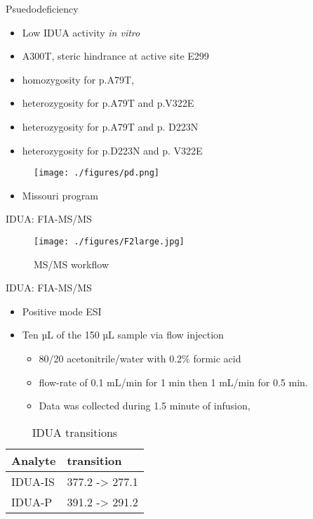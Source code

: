 \documentclass[presentation, smaller]{beamer}
\begin{document}
\begin{frame}[label={sec:orgheadline12}]{Psuedodeficiency}
\begin{itemize}
\item Low IDUA activity \emph{in vitro}
\item A300T, steric hindrance at active site E299
\item homozygosity for p.A79T,
\item heterozygosity for p.A79T and p.V322E
\item heterozygosity for p.A79T and p. D223N
\item heterozygosity for p.D223N and p. V322E
\end{itemize}

\begin{figure}[htb]
\centering
\texttt{[image: ./figures/pd.png]}
\label{fig:pd}
\end{figure}


\begin{itemize}
\item Missouri program
\end{itemize}
\end{frame}


\begin{frame}[label={sec:orgheadline13}]{IDUA: FIA-MS/MS}
\begin{figure}[htb]
\centering
\texttt{[image: ./figures/F2large.jpg]}
\caption{\label{fig:msmswf}
MS/MS workflow}
\end{figure}
\end{frame}


\begin{frame}[label={sec:orgheadline14}]{IDUA: FIA-MS/MS}
\begin{itemize}
\item Positive mode ESI
\item Ten µL of the 150 µL sample via flow injection
\begin{itemize}
\item 80/20 acetonitrile/water with 0.2\% formic acid
\item flow-rate of 0.1 mL/min for 1 min then 1 mL/min for 0.5 min.
\item Data was collected during 1.5 minute of infusion,
\end{itemize}
\end{itemize}

\begin{table}[htb]
\caption{\label{tab:mrm}
IDUA transitions}
\centering
\begin{tabular}{ll}
Analyte & transition\\
\hline
IDUA-IS & 377.2 -> 277.1\\
IDUA-P & 391.2 -> 291.2\\
\end{tabular}
\end{table}
\end{frame}
\end{document}
